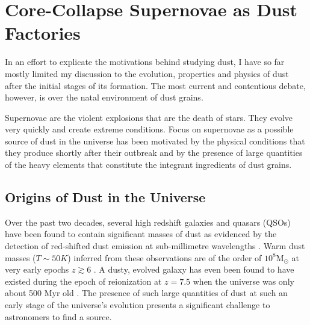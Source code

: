 \section{Core-Collapse Supernovae as Dust Factories}
\label{scn:ccsne}
In an effort to explicate the motivations behind studying dust, I have so far mostly limited my discussion to the evolution, properties and physics of dust after the initial stages of its formation.  The most current and contentious debate, however, is over the natal environment of dust grains.  

Supernovae are the violent explosions that are the death of stars.  They evolve very quickly and create extreme conditions.  Focus on supernovae as a possible source of dust in the universe has been motivated by the physical conditions that they produce shortly after their outbreak and by the presence of large quantities of the heavy elements that constitute the integrant ingredients of dust grains.

\subsection{Origins of Dust in the Universe}

Over the past two decades, several high redshift galaxies and quasars (QSOs) have been found to contain significant masses of dust as evidenced by the detection of red-shifted dust emission at sub-millimetre wavelengths \citep{Carilli2001, Omont2001, Bertoldi2002, Bertoldi2003, Watson2015}.  Warm dust masses ($T\sim50K$) inferred from these observations are of the order of $10^8$M$_{\odot}$ at very early epochs $z \gtrsim 6$ \citep{Robson2004,Beelen2006,Dwek2007}.  A dusty, evolved galaxy has even been found to have existed during the epoch of reionization at $z=7.5$ when the universe was only about 500 Myr old \citep{Watson2015}.  The presence of such large quantities of dust at such an early stage of the universe's evolution presents a significant challenge to astronomers to find a source.  

